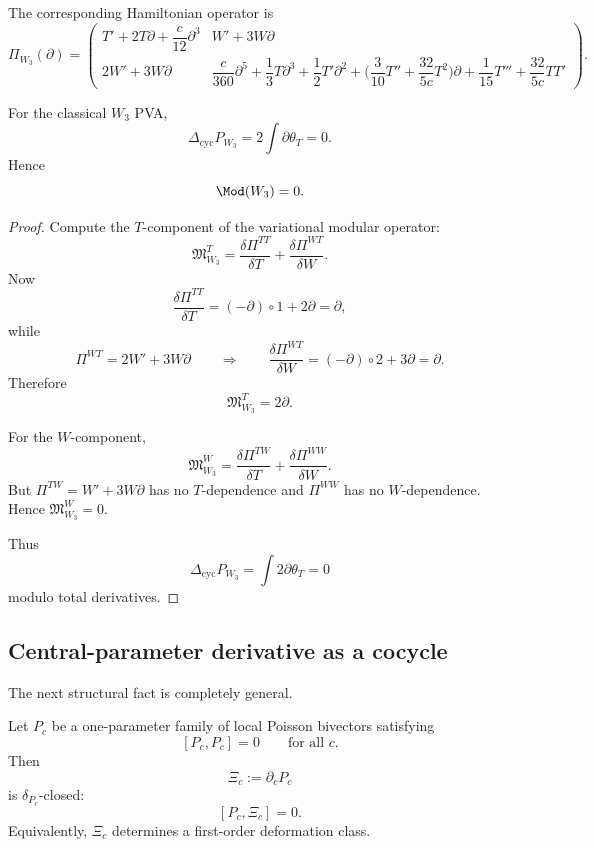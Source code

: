 The corresponding Hamiltonian operator is
\[
\Pi_{W_3}(\partial)=
\begin{pmatrix}
T'+2T\partial+\dfrac c{12}\partial^3
&
W'+3W\partial
\\[2mm]
2W'+3W\partial
&
\dfrac c{360}\partial^5
+\dfrac13 T\partial^3
+\dfrac12 T'\partial^2
+\Big(\dfrac{3}{10}T''+\dfrac{32}{5c}T^2\Big)\partial
+\dfrac1{15}T'''
+\dfrac{32}{5c}TT'
\end{pmatrix}.
\]

\begin{theorem}\label{thm:W3mod0}
For the classical $W_3$ PVA,
\[
\Delta_{\mathrm{cyc}}P_{W_3}=2\int \partial\theta_T=0.
\]
Hence
\[
\Mod(W_3)=0.
\]
\end{theorem}

\begin{proof}
Compute the $T$-component of the variational modular operator:
\[
\mathfrak M_{W_3}^T
=
\frac{\delta \Pi^{TT}}{\delta T}
+
\frac{\delta \Pi^{WT}}{\delta W}.
\]
Now
\[
\frac{\delta \Pi^{TT}}{\delta T}=(-\partial)\circ 1+2\partial=\partial,
\]
while
\[
\Pi^{WT}=2W'+3W\partial
\qquad\Longrightarrow\qquad
\frac{\delta \Pi^{WT}}{\delta W}=(-\partial)\circ 2 + 3\partial=\partial.
\]
Therefore
\[
\mathfrak M_{W_3}^T=2\partial.
\]

For the $W$-component,
\[
\mathfrak M_{W_3}^W
=
\frac{\delta \Pi^{TW}}{\delta T}
+
\frac{\delta \Pi^{WW}}{\delta W}.
\]
But $\Pi^{TW}=W'+3W\partial$ has no $T$-dependence and $\Pi^{WW}$ has no $W$-dependence.
Hence $\mathfrak M_{W_3}^W=0$.

Thus
\[
\Delta_{\mathrm{cyc}}P_{W_3}=\int 2\partial\theta_T=0
\]
modulo total derivatives.
\end{proof}

\subsection{Central-parameter derivative as a cocycle}

The next structural fact is completely general.

\begin{theorem}\label{thm:parameter-cocycle}
Let $P_c$ be a one-parameter family of local Poisson bivectors satisfying
\[
[P_c,P_c]=0
\qquad\text{for all }c.
\]
Then
\[
\Xi_c:=\partial_c P_c
\]
is $\delta_{P_c}$-closed:
\[
[P_c,\Xi_c]=0.
\]
Equivalently, $\Xi_c$ determines a first-order deformation class.
\end{theorem}

